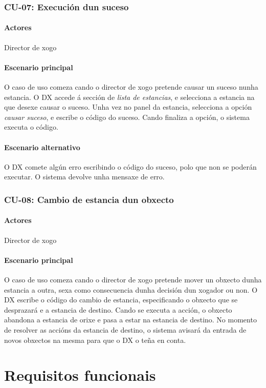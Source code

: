 \subsubsection{CU-07: Execución dun suceso}
\paragraph{Actores}
Director de xogo
\paragraph{Escenario principal}
O caso de uso comeza cando o director de xogo pretende causar un suceso nunha
estancia. O DX accede á sección de {\it lista de estancias}, e selecciona a
estancia na que desexe causar o suceso. Unha vez no panel da estancia,
selecciona a opción {\it causar suceso}, e escribe o código do suceso. Cando
finaliza a opción, o sistema executa o código.

\paragraph{Escenario alternativo}
O DX comete algún erro escribindo o código do suceso, polo que non se poderán
executar. O sistema devolve unha mensaxe de erro.

\subsubsection{CU-08: Cambio de estancia dun obxecto}
\paragraph{Actores}
Director de xogo
\paragraph{Escenario principal}
O caso de uso comeza cando o director de xogo pretende mover un obxecto dunha estancia a outra, sexa como consecuencia dunha decisión dun xogador ou non. O DX escribe o código do cambio de estancia, especificando o obxecto que se desprazará e a estancia de destino. Cando se executa a acción, o obxecto abandona a estancia de orixe e pasa a estar na estancia de destino. No momento de resolver as accións da estancia de destino, o sistema avisará da entrada de novos obxectos na mesma para que o DX o teña en conta.


\section{Requisitos funcionais}
